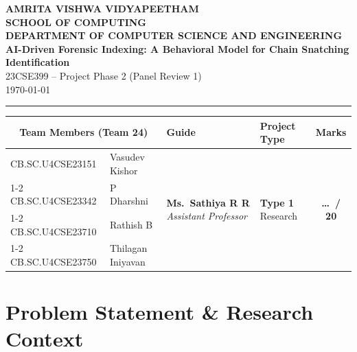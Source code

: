 \documentclass[11pt, a4paper]{article}
\begin{document}
\noindent
\begin{minipage}{\textwidth}
    \centering
    {\Large \textbf{\textcolor{amritaMaroon}{
        AMRITA VISHWA VIDYAPEETHAM \\
        SCHOOL OF COMPUTING \\
        DEPARTMENT OF COMPUTER SCIENCE AND ENGINEERING
    }}}
    \vspace{0.2cm} \\
    {\large \textbf{AI-Driven Forensic Indexing: A Behavioral Model for Chain Snatching Identification}} \\
    \vspace{0.1cm}
    23CSE399 -- Project Phase 2 (Panel Review 1) \\ \today
\end{minipage}

\vspace{0.3cm}
\hrule
\vspace{0.3cm}

\noindent
\begin{center}
\renewcommand{\arraystretch}{1.4}
\setlength{\tabcolsep}{5pt}
\begin{tabular}{|l|p{4.2cm}|p{4cm}|p{2.5cm}|c|}
\hline
\multicolumn{2}{|c|}{\textbf{Team Members (Team 24)}} & \textbf{Guide} & \textbf{Project Type} & \textbf{Marks} \\
\hline
\small CB.SC.U4CSE23151 & \small Vasudev Kishor &
    \multirow{4}{=}{\raggedright \small \textbf{Ms.~Sathiya R R} \newline \textit{Assistant Professor}} &
    \multirow{4}{=}{\raggedright \small \textbf{Type 1} \newline Research} &
    \multirow{4}{*}{\textbf{\huge \dots\ / 20}} \\
\cline{1-2}
\small CB.SC.U4CSE23342 & \small P Dharshni & & & \\
\cline{1-2}
\small CB.SC.U4CSE23710 & \small Rathish B & & & \\
\cline{1-2}
\small CB.SC.U4CSE23750 & \small Thilagan Iniyavan & & & \\
\hline
\end{tabular}
\end{center}

\section{Problem Statement \& Research Context}
\end{document}
